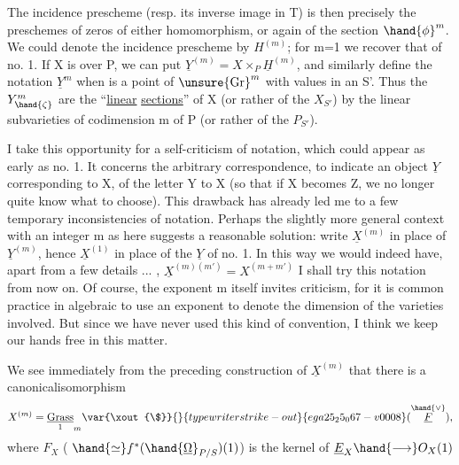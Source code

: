 
The incidence prescheme (resp. its inverse image in T) is then
precisely the preschemes of zeros of either homomorphism,
or again of the section $\hand{\phi}^{m}$. We could denote the incidence
prescheme by $H^{(m)}$; for m=1 we recover that of no. 1. If X is
over P, we can put $\underline{Y}^{(m)} = X\times_{P} \underline{H}^{(m)}$, and similarly define
the notation $\underline{Y}^{m}$ when \hand{$\zeta$} is a point of $\unsure{\mathrm{Gr}}^{m}$ with values in an S'.
Thus the  $Y^{m}_{\hand{\zeta}}$ are the “\uline{linear} \uline{sections}” of X  (or rather of
the $X_{S'}$) by the linear subvarieties of codimension m of P (or
rather of the $P_{S'}$).

I take this opportunity for a self-criticism of notation,
which could appear as early as no. 1. It concerns the arbitrary correspondence,
to indicate an object $\underline{Y}$ corresponding to X, of the letter
Y to X (so that if X becomes Z, we no longer quite know what
to choose). This drawback has already led me to a few temporary inconsistencies
of notation. Perhaps the slightly more general context
with an integer m as here suggests a reasonable solution: write
$\underline{X}^{(m)}$ in place of $\underline{Y}^{(m)}$, hence $\underline{X}^{(1)}$ in place of the $\underline{Y}$ of no. 1. In this
way we would indeed have, apart from a few details ... , $\underline{X}^{(m)(m')} = X^{(m+m')}$
I shall try this notation from now on. Of course, the exponent m
itself invites criticism, for it is common practice in algebraic 
to use an exponent to denote the dimension of the varieties
involved. But since we have never used this kind
of convention, I think we keep our hands free in this matter.

We see immediately from the preceding construction of $\underline{X}^{(m)}$ that
there is a canonicalisomorphism
\[ X^{(m)} = \underset{1}{\underline{\mathrm{Grass}}}_{m}\var{\xout{\$}}{}{typewriter strike-out}{ega25_25_067-v0008}(\overset{\hand{\vee}}{\underline{F}}) , \]
where $F_{X}$ ( $\hand{\simeq} f^{*}(\hand{\underline{\Omega}}_{P/S})(1)$) is the kernel of $\underline{E}_{X} \hand{\longrightarrow} O_{X}(1)$\hand{,}

